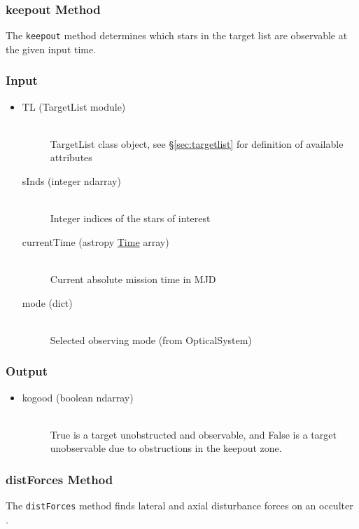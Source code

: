 \documentclass[cleanfoot]{asme2ej}
\begin{document}
\subsubsection{keepout Method} \label{sec:keepouttask} 
The \verb+keepout+ method determines which stars in the target list are observable at the given input time.

\subsubsection*{Input}
\begin{itemize}
\item
\begin{description}
    \item[TL (TargetList module)] \hfill \\ TargetList class object, see \S\ref{sec:targetlist} for definition of available attributes
    \item[sInds (integer ndarray)] \hfill \\ Integer indices of the stars of interest
    \item[currentTime (astropy \href{http://astropy.readthedocs.org/en/latest/time/index.html}{Time} array)] \hfill \\ Current absolute mission time in MJD
    \item[mode (dict)] \hfill \\ Selected observing mode (from OpticalSystem)
\end{description}
\end{itemize}

\subsubsection*{Output}
\begin{itemize}
\item 
\begin{description}
    \item[kogood (boolean ndarray)] \hfill \\ True is a target unobstructed and observable, and False is a target unobservable due to obstructions in the keepout zone.
\end{description}
\end{itemize}

\subsubsection{distForces Method} \label{sec:distforcestask} 
The \verb+distForces+ method finds lateral and axial disturbance forces on an occulter .
\end{document}
